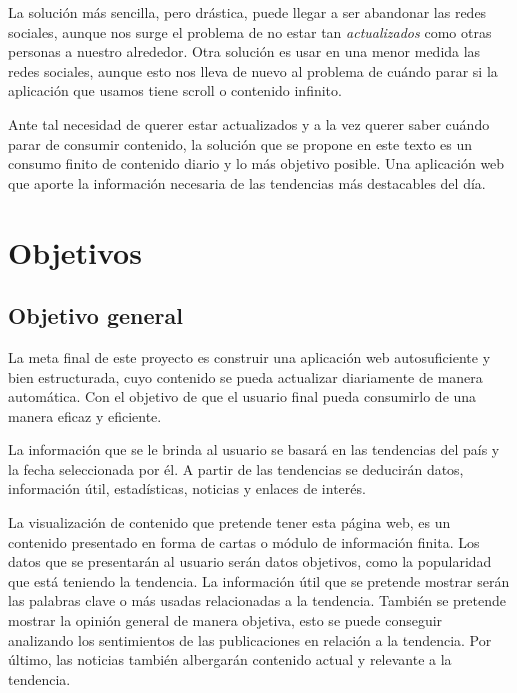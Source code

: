 \vspace{0.3cm}

La solución más sencilla, pero drástica, puede llegar a ser abandonar las redes sociales, aunque nos surge el problema de no estar tan \textit{actualizados} como otras personas a nuestro alrededor. Otra solución es usar en una menor medida las redes sociales, aunque esto nos lleva de nuevo al problema de cuándo parar si la aplicación que usamos tiene scroll o contenido infinito.

\vspace{0.3cm}

Ante tal necesidad de querer estar actualizados y a la vez querer saber cuándo parar de consumir contenido, la solución que se propone en este texto es un consumo finito de contenido diario y lo más objetivo posible. Una aplicación web que aporte la información necesaria de las tendencias más destacables del día.

\section{Objetivos}

\subsection{Objetivo general}
La meta final de este proyecto es construir una aplicación web autosuficiente y bien estructurada, cuyo contenido se pueda actualizar diariamente de manera automática. Con el objetivo de que el usuario final pueda consumirlo de una manera eficaz y eficiente.

\vspace{0.3cm}

La información que se le brinda al usuario se basará en las tendencias del país y la fecha seleccionada por él. A partir de las tendencias se deducirán datos, información útil, estadísticas, noticias y enlaces de interés.

\vspace{0.3cm}

La visualización de contenido que pretende tener esta página web, es un contenido presentado en forma de cartas o módulo de información finita. Los datos que se presentarán al usuario serán datos objetivos, como la popularidad que está teniendo la tendencia. La información útil que se pretende mostrar serán las palabras clave o más usadas relacionadas a la tendencia. También se pretende mostrar la opinión general de manera objetiva, esto se puede conseguir analizando los sentimientos de las publicaciones en relación a la tendencia. Por último, las noticias también albergarán contenido actual y relevante a la tendencia.

